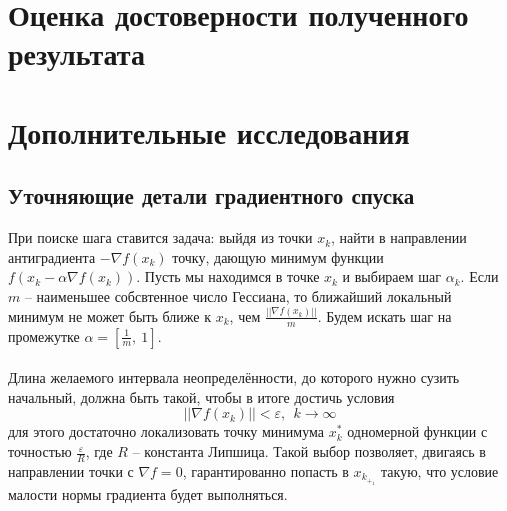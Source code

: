 \documentclass{article}
\begin{document}
\section{Оценка достоверности полученного результата}
\begin{figure}[H]
\label{fig:image}
\end{figure}

\section{Дополнительные исследования}
\subsection{Уточняющие детали градиентного спуска}
\noindent При поиске шага ставится задача: выйдя из точки $x_k$, найти в направлении антиградиента $-\nabla f(x_k)$ точку, дающую минимум функции $f(x_k - \alpha \nabla f(x_k))$. Пусть мы находимся в точке $x_k$ и выбираем шаг $\alpha_k$. Если $m$ -- наименьшее собсвтенное число Гессиана, то ближайший локальный минимум не может быть ближе к $x_k$, чем $\frac{||\nabla f(x_k)||}{m}$. Будем искать шаг на промежутке $\alpha = [\frac{1}{m},~1]$.
\\\\
\noindent Длина желаемого интервала неопределённости, до которого нужно сузить начальный, должна быть такой, чтобы в итоге достичь условия 
$$||\nabla f(x_k)||< \varepsilon, ~~k \rightarrow \infty$$
для этого достаточно локализовать точку минимума $x_k^{*}$ одномерной функции с точностью $\frac{\varepsilon}{R}$, где $R$ -- константа Липшица. Такой выбор позволяет, двигаясь в направлении точки с $\nabla f = 0$, гарантированно попасть в $x_k_+_1$ такую, что условие малости нормы градиента будет выполняться.
\end{document}
